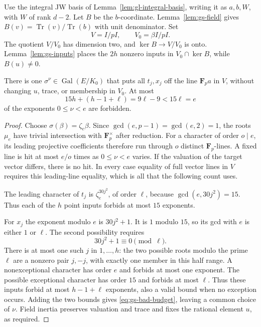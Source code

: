 Use the integral JW basis of Lemma~\ref{lem:gl-integral-basis},
writing it as $a,b,W$, with $W$ of rank $d-2$. Let $B$ be the
$b$-coordinate. Lemma~\ref{lem:gs-field} gives
$B(v)=\operatorname{Tr}(v)/\operatorname{Tr}(b)$ with unit denominator.
Set
\[
 V=I/pI,\qquad V_0=\beta I/pI.
\]
The quotient $V/V_0$ has dimension two, and $\ker B\to V/V_0$
is onto. Lemma~\ref{lem:gs-inputs} places the $2h$ nonzero inputs
in $V_0\cap\ker B$, while $B(u)\ne0$.

\begin{lemma}\label{lem:gs-inertia}
There is one $\sigma^\nu\in\operatorname{Gal}(E/K_0)$ that puts
all $t_j,x_j$ off the line $\mathbf F_pa$ in $V$, without changing
$u$, trace, or membership in $V_0$. At most
\begin{equation}\label{eq:gs-bad-budget}
 15h+(h-1+\ell)=9\ell-9<15\ell=e
\end{equation}
of the exponents $0\le\nu<e$ are forbidden.
\end{lemma}
\begin{proof}
Choose $\sigma(\beta)=\zeta_e\beta$. Since
$\gcd(e,p-1)=\gcd(e,2)=1$, the roots $\mu_e$ have trivial
intersection with $\mathbf F_p^\times$ after reduction.
For a character of order $o\mid e$, its leading projective
coefficients therefore run through $o$ distinct $\mathbf F_p$-lines.
A fixed line is hit at most $e/o$ times as $0\le\nu<e$ varies.
If the valuation of the target vector differs, there is no hit.
In every case equality of full vector lines in $V$ requires this
leading-line equality, which is all that the following count uses.

The leading character of $t_j$ is $\zeta_e^{30j^2}$, of order
$\ell$, because $\gcd(e,30j^2)=15$. Thus each of the $h$ point
inputs forbids at most $15$ exponents.

For $x_j$ the exponent modulo $e$ is $30j^2+1$. It is $1$
modulo $15$, so its gcd with $e$ is either $1$ or $\ell$.
The second possibility requires
\[
                       30j^2+1\equiv0\pmod\ell.
\]
There is at most one such $j$ in $1,\ldots,h$: the two possible
roots modulo the prime $\ell$ are a nonzero pair $j,-j$, with
exactly one member in this half range. A nonexceptional character
has order $e$ and forbids at most one exponent. The possible
exceptional character has order $15$ and forbids at most $\ell$.
Thus these inputs forbid at most $h-1+\ell$ exponents, also a
valid bound when no exception occurs. Adding the two bounds gives
\eqref{eq:gs-bad-budget}, leaving a common choice of $\nu$.
Field inertia preserves valuation and trace and fixes the rational
element $u$, as required.
\end{proof}

